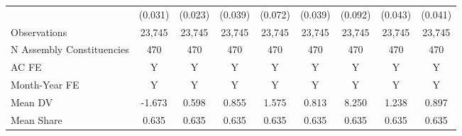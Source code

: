 {\begin{tabular}{l*{8}{c}}
            &     (0.031)         &     (0.023)         &     (0.039)         &     (0.072)         &     (0.039)         &     (0.092)         &     (0.043)         &     (0.041)         \\
Observations&      23,745         &      23,745         &      23,745         &      23,745         &      23,745         &      23,745         &      23,745         &      23,745         \\
N Assembly Constituencies&         470         &         470         &         470         &         470         &         470         &         470         &         470         &         470         \\
AC FE       &           Y         &           Y         &           Y         &           Y         &           Y         &           Y         &           Y         &           Y         \\
Month-Year FE&           Y         &           Y         &           Y         &           Y         &           Y         &           Y         &           Y         &           Y         \\
Mean DV     &      -1.673         &       0.598         &       0.855         &       1.575         &       0.813         &       8.250         &       1.238         &       0.897         \\
Mean Share  &       0.635         &       0.635         &       0.635         &       0.635         &       0.635         &       0.635         &       0.635         &       0.635         \\
\bottomrule
\end{tabular}
}

